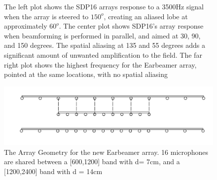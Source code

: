 \documentclass[10pt,journal,compsoc]{IEEEtran}
\begin{document}
\begin{figure}[!t]
\centering
{}
\hfil
{}
\hfil
{}
\caption{The left plot shows the SDP16 arrays response to a 3500Hz signal when the array is steered to $150^o$, creating an aliased lobe at approximately $60^o$. The center plot shows SDP16’s array response when beamforming is performed in parallel, and aimed at 30, 90, and 150 degrees. The spatial aliasing at 135 and 55 degrees adds a significant amount of unwanted amplification to the field. The far right plot shows the highest frequency for the Earbeamer array, pointed at the same locations, with no spatial aliasing}
\label{fig:multi_beam}
\end{figure}

\begin{figure}
    \centering
    \includegraphics[width=6in]{array}
    \caption{ The Array Geometry for the new Earbeamer array. 16 microphones are shared between a [600,1200] band with d= 7cm, and a [1200,2400] band with d = 14cm}
    \label{fig:array}
\end{figure}
\end{document}
